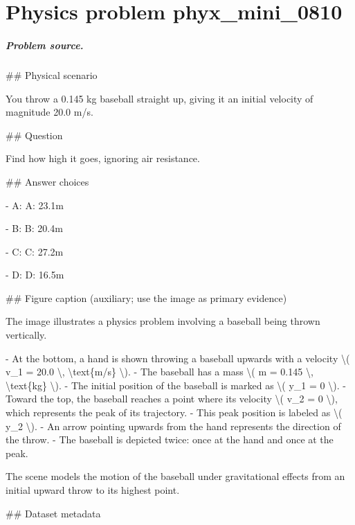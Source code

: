 
\chapter{Physics problem phyx\_mini\_0810}
\label{ch:PhyXMiniProblems_problem_phyx_mini_0810}

\paragraph{Problem source.}
\#\# Physical scenario

You throw a 0.145 kg baseball straight up, giving it an initial velocity of magnitude 20.0 m/s.

\#\# Question

Find how high it goes, ignoring air resistance.

\#\# Answer choices

- A: A: 23.1m

- B: B: 20.4m

- C: C: 27.2m

- D: D: 16.5m

\#\# Figure caption (auxiliary; use the image as primary evidence)

The image illustrates a physics problem involving a baseball being thrown vertically. 

- At the bottom, a hand is shown throwing a baseball upwards with a velocity \textbackslash{}( v\_1 = 20.0 \textbackslash{}, \textbackslash{}text\{m/s\} \textbackslash{}).
- The baseball has a mass \textbackslash{}( m = 0.145 \textbackslash{}, \textbackslash{}text\{kg\} \textbackslash{}).
- The initial position of the baseball is marked as \textbackslash{}( y\_1 = 0 \textbackslash{}).
- Toward the top, the baseball reaches a point where its velocity \textbackslash{}( v\_2 = 0 \textbackslash{}), which represents the peak of its trajectory.
- This peak position is labeled as \textbackslash{}( y\_2 \textbackslash{}). 
- An arrow pointing upwards from the hand represents the direction of the throw.
- The baseball is depicted twice: once at the hand and once at the peak.

The scene models the motion of the baseball under gravitational effects from an initial upward throw to its highest point.

\#\# Dataset metadata

